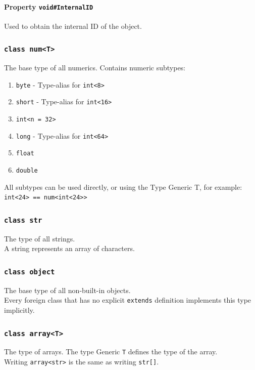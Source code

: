 \documentclass{docs}
\begin{document}
    \paragraph{Property \texttt{void\#InternalID}}
    Used to obtain the internal ID of the object.
    
    \subsubsection{\texttt{class num<T>}}
    The base type of all numerics. Contains numeric subtypes:
    \begin{enumerate}
        \item \texttt{byte} - Type-alias for \texttt{int<8>} %
        \item \texttt{short} - Type-alias for \texttt{int<16>}
        \item \texttt{int<n = 32>}
        \item \texttt{long} - Type-alias for \texttt{int<64>}
        \item \texttt{float}
        \item \texttt{double}
    \end{enumerate}
    All subtypes can be used directly, or using the Type Generic T, for example: \texttt{int<24> == num<int<24>>}
    
    \subsubsection{\texttt{class str}}
    The type of all strings.
    \\
    A string represents an array of characters.
    
    \subsubsection{\texttt{class object}}
    The base type of all non-built-in objects.
    \\
    Every foreign class that has no explicit \texttt{extends} definition implements this type implicitly.
    
    \subsubsection{\texttt{class array<T>}}
    The type of arrays. The type Generic \texttt{T} defines the type of the array.
    \\
    Writing \texttt{array<str>} is the same as writing \texttt{str[]}.
    
\end{document}
